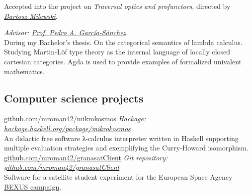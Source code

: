 \documentclass[nocolors]{friggeri-cv-a4}
\begin{document}
\begin{entrylist}
  { Accepted into the project on
    \textit{Traversal optics and profunctors}, directed by \textit{\href{https://bartoszmilewski.com/2019/01/05/act2019-school-call-for-participation/}{Bartosz Milewski}}.
  }
  
  { {\small \textit{Advisor: \href{https://scholar.google.es/citations?user=gvq9UmMAAAAJ&hl=en&oi=ao}{Prof. Pedro A. García-Sánchez}.}} \\
    During my Bachelor's thesis. On the categorical semantics of
    lambda calculus. Studying Martin-Löf type theory as the internal
    language of locally closed cartesian categories. Agda is used to
    provide examples of formalized univalent mathematics.  }

   


\end{entrylist}




\subsection{Computer science projects}



\begin{entrylist}
{\href{https://github.com/mroman42/mikrokosmos}{github.com/mroman42/mikrokosmos}}
{\emph{Hackage: \href{https://hackage.haskell.org/package/mikrokosmos}{hackage.haskell.org/package/mikrokosmos}} \\
  An didactic free software λ-calculus interpreter written in Haskell supporting multiple evaluation strategies and exemplifying the Curry-Howard isomorphism.
}
{\href{https://github.com/mroman42/granasatClient}{github.com/mroman42/granasatClient}}
{\emph{Git repository: \href{https://github.com/mroman42/granasatClient}{github.com/mroman42/granasatClient}} \\
  Software for a satellite student experiment for the
  European Space Agency \href{http://rexusbexus.net/}{BEXUS campaign}.
}
\end{entrylist}
\end{document}
